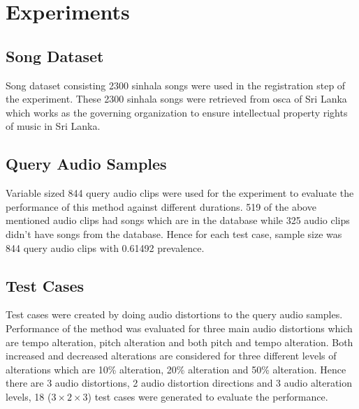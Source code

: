 \section{Experiments}
\label{section:experiments}

\subsection{Song Dataset}
Song dataset consisting 2300 sinhala songs were used in the registration step of the experiment. These 2300 sinhala songs were retrieved from
\ac{osca} of Sri Lanka which works as the governing organization to ensure intellectual property rights of music in Sri Lanka. 

\subsection{Query Audio Samples}
Variable sized 844 query audio clips were used for the experiment to evaluate the performance of this method
against different durations. 519 of the above mentioned audio clips had songs which are in the database while 325 audio clips didn't have songs from 
the database. Hence for each test case, sample size was 844 query audio clips with 0.61492 prevalence.    

\subsection{Test Cases}
Test cases were created by doing audio distortions to the query audio samples. Performance of the method was evaluated for three main audio distortions
which are tempo alteration, pitch alteration and both pitch and tempo alteration. Both increased and decreased alterations are considered for three different
levels of alterations which are 10\% alteration, 20\% alteration and 50\% alteration. Hence there are 3 audio distortions, 2 audio distortion directions and
3 audio alteration levels, 18 (\(3 \times 2 \times 3\)) test cases were generated to evaluate the performance. 


